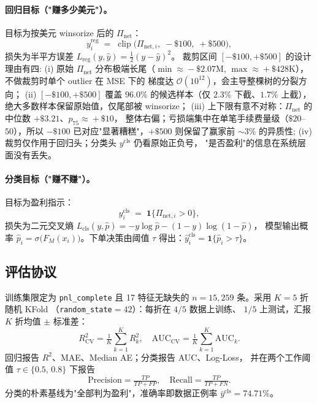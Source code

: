 \documentclass[sigconf,nonacm,10pt]{acmart}
\newcommand{\Pnet}{\Pi_{\text{net}}}
\begin{document}
\paragraph{回归目标（"赚多少美元"）。}
目标为按美元 winsorize 后的 $\Pnet$：
\begin{equation}
y^{\text{reg}}_i \;=\; \operatorname{clip}\!\bigl(\Pi_{\text{net},i},\;
-\$100,\; +\$500\bigr),
\label{eq:reg-target}
\end{equation}
损失为半平方误差
$L_{\text{reg}}(y,\hat y)=\tfrac12(y-\hat y)^2$。
裁剪区间 $[-\$100,+\$500]$ 的设计理由有四:
(i) 原始 $\Pnet$ 分布极端长尾（$\min\!\approx\!-\$2.07$M,
$\max\!\approx\!+\$428$K），不做裁剪时单个 outlier 在 MSE 下的
梯度达 $\mathcal{O}(10^{12})$，会主导整棵树的分裂方向；
(ii) $[-\$100,+\$500]$ 覆盖 $96.0\%$ 的候选样本（仅 $2.3\%$
下截、$1.7\%$ 上截），绝大多数样本保留原始值，仅尾部被 winsorize；
(iii) 上下限有意不对称：$\Pnet$ 的中位数 $+\$3.21$、$p_{75}\!\approx\!+\$10$，
整体右偏；亏损端集中在单笔手续费量级（$\$20$--$50$），所以
$-\$100$ 已对应"显著糟糕"，$+\$500$ 则保留了赢家前 $\sim\!3\%$
的异质性;
(iv) 裁剪仅作用于回归头；分类头 $y^{\text{cls}}$ 仍看原始正负号，
"是否盈利"的信息在系统层面没有丢失。

\paragraph{分类目标（"赚不赚"）。}
目标为盈利指示：
\begin{equation}
y^{\text{cls}}_i \;=\; \mathbf{1}\{\Pi_{\text{net},i}>0\},
\label{eq:cls-target}
\end{equation}
损失为二元交叉熵
$L_{\text{cls}}(y,\hat p)=-y\log\hat p-(1-y)\log(1-\hat p)$，
模型输出概率 $\hat p_i=\sigma\!\bigl(F_M(x_i)\bigr)$。下单决策由阈值
$\tau$ 得出：$\hat y^{\text{cls}}_i = \mathbf{1}\{\hat p_i>\tau\}$。

\subsection{评估协议}

训练集限定为 \texttt{pnl\_complete} 且 17 特征无缺失的
$n=15{,}259$ 条。采用 $K=5$ 折随机 KFold
（\texttt{random\_state}$=42$）：每折在 $4/5$ 数据上训练、
$1/5$ 上测试，汇报 $K$ 折均值 $\pm$ 标准差：
\begin{equation}
R^2_{\text{CV}} = \tfrac{1}{K}\sum_{k=1}^{K} R^2_k,\quad
\text{AUC}_{\text{CV}} = \tfrac{1}{K}\sum_{k=1}^{K} \text{AUC}_k.
\label{eq:cv}
\end{equation}
回归报告 $R^2$、MAE、Median AE；分类报告 AUC、Log-Loss，
并在两个工作阈值 $\tau\in\{0.5,\, 0.8\}$ 下报告
\begin{equation}
\text{Precision}=\tfrac{TP}{TP+FP},\quad
\text{Recall}=\tfrac{TP}{TP+FN}.
\label{eq:pr}
\end{equation}
分类的朴素基线为"全部判为盈利"，准确率即数据正例率
$\bar y^{\text{cls}}=74.71\%$。
\end{document}

